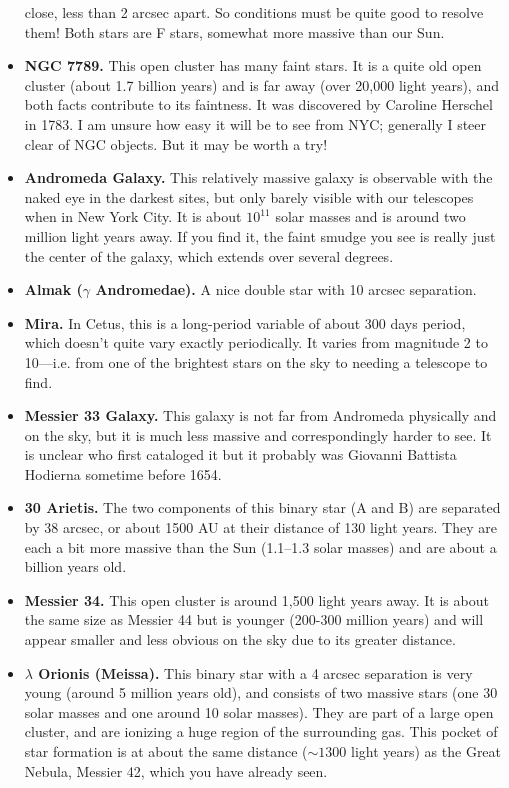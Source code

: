 \begin{itemize}
close, less than 2 arcsec apart. So conditions must be quite good to
resolve them! Both stars are F stars, somewhat more massive than our
Sun.
\item {\bf NGC 7789.} This open cluster has many faint stars. It is a
quite old open cluster (about 1.7 billion years) and is far away (over
20,000 light years), and both facts contribute to its faintness. It
was discovered by Caroline Herschel in 1783. I am unsure how easy it
will be to see from NYC; generally I steer clear of NGC objects. But
it may be worth a try!
\item {\bf Andromeda Galaxy.} This relatively massive galaxy is observable
with the naked eye in the darkest sites, but only barely visible with
  our telescopes when in New York City. It is about $10^{11}$ solar
  masses and is around two million light years away. If you find it,
  the faint smudge you see is really just the center of the galaxy,
  which extends over several degrees. 
\item {\bf Almak ($\gamma$ Andromedae).} A nice double star with 10
  arcsec separation.
\item {\bf Mira.} In Cetus, this is a long-period variable of about
300 days period, which doesn't quite vary exactly periodically. It
  varies from magnitude 2 to 10---i.e. from one of the brightest stars
  on the sky to needing a telescope to find.
\item {\bf Messier 33 Galaxy.} This galaxy is not far from Andromeda
  physically and on the sky, but it is much less massive and
  correspondingly harder to see. It is unclear who first cataloged it
  but it probably was Giovanni Battista Hodierna sometime before 1654.
\item {\bf 30 Arietis.} The two components of this binary star (A and
  B) are separated by 38 arcsec, or about 1500 AU at their distance of
  130 light years.  They are each a bit more massive than the Sun
  (1.1--1.3 solar masses) and are about a billion years old.
\item {\bf Messier 34.} This open cluster is around 1,500 light years
  away. It is about the same size as Messier 44 but is younger
  (200-300 million years) and will appear smaller and less obvious on
  the sky due to its greater distance. 
\item {\bf $\lambda$ Orionis (Meissa).} This binary star with
a 4 arcsec separation is very young (around 5 million years old), and
  consists of two massive stars (one 30 solar masses and one around 10
  solar masses). They are part of a large open cluster, and are
  ionizing a huge region of the surrounding gas. This pocket of star
  formation is at about the same distance ($\sim 1300$ light years) as
  the Great Nebula, Messier 42, which you have already seen.
\end{itemize}
